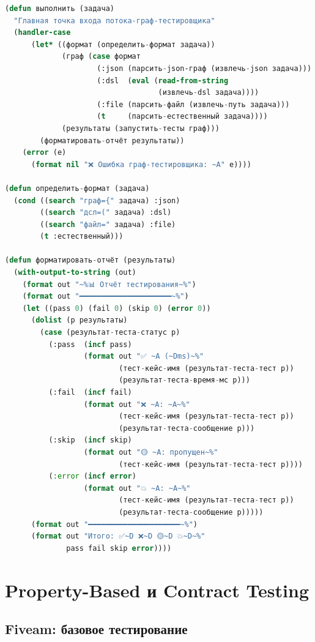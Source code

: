 \documentclass[10pt, oneside]{article}
\begin{document}
\begin{lstlisting}[language=CommonLisp,caption={Функция выполнить для потока}]
(defun выполнить (задача)
  "Главная точка входа потока-граф-тестировщика"
  (handler-case
      (let* ((формат (определить-формат задача))
             (граф (case формат
                     (:json (парсить-json-граф (извлечь-json задача)))
                     (:dsl  (eval (read-from-string
                                   (извлечь-dsl задача))))
                     (:file (парсить-файл (извлечь-путь задача)))
                     (t     (парсить-естественный задача))))
             (результаты (запустить-тесты граф)))
        (форматировать-отчёт результаты))
    (error (e)
      (format nil "❌ Ошибка граф-тестировщика: ~A" e))))

(defun определить-формат (задача)
  (cond ((search "граф={" задача) :json)
        ((search "дсл=(" задача) :dsl)
        ((search "файл=" задача) :file)
        (t :естественный)))

(defun форматировать-отчёт (результаты)
  (with-output-to-string (out)
    (format out "~%📊 Отчёт тестирования~%")
    (format out "━━━━━━━━━━━━━━━━━━━━━~%")
    (let ((pass 0) (fail 0) (skip 0) (error 0))
      (dolist (р результаты)
        (case (результат-теста-статус р)
          (:pass  (incf pass)
                  (format out "✅ ~A (~Dms)~%"
                          (тест-кейс-имя (результат-теста-тест р))
                          (результат-теста-время-мс р)))
          (:fail  (incf fail)
                  (format out "❌ ~A: ~A~%"
                          (тест-кейс-имя (результат-теста-тест р))
                          (результат-теста-сообщение р)))
          (:skip  (incf skip)
                  (format out "🟡 ~A: пропущен~%"
                          (тест-кейс-имя (результат-теста-тест р))))
          (:error (incf error)
                  (format out "💥 ~A: ~A~%"
                          (тест-кейс-имя (результат-теста-тест р))
                          (результат-теста-сообщение р)))))
      (format out "━━━━━━━━━━━━━━━━━━━━━~%")
      (format out "Итого: ✅~D ❌~D 🟡~D 💥~D~%"
              pass fail skip error))))
\end{lstlisting}

\section{Property-Based и Contract Testing}

\subsection{Fiveam: базовое тестирование}
\end{document}
